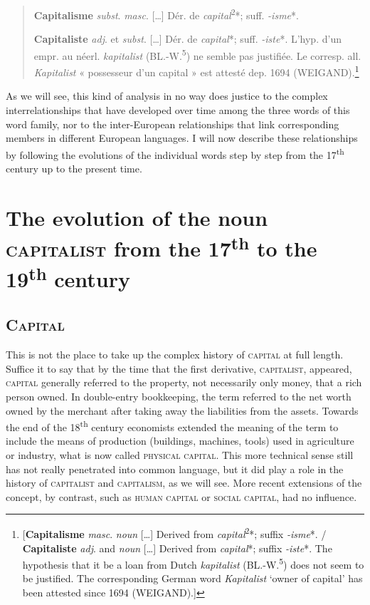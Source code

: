 \documentclass[output=paper]{langsci/langscibook}
\begin{document}
\begin{quote}
\textbf{Capitalisme} \emph{subst}. \emph{masc}. {[}\ldots{}{]} Dér. de
\emph{capital}\textsuperscript{2}*; suff. \emph{-isme}*.

\textbf{Capitaliste} \emph{adj}. et \emph{subst}. {[}\ldots{}{]} Dér. de
\emph{capital}*; suff. \emph{-iste}*. L'hyp. d'un empr. au néerl.
\emph{kapitalist} (BL.-W.\textsuperscript{5}) ne semble pas justifiée.
Le corresp. all. \emph{Kapitalist} « possesseur d'un capital » est
attesté dep. 1694 (WEIGAND).\footnote{{[}\textbf{Capitalisme}
  \emph{masc}. \emph{noun} {[}\ldots{}{]} Derived from
  \emph{capital}\textsuperscript{2}*; suffix \emph{-isme}*. /
  \textbf{Capitaliste} \emph{adj}. and \emph{noun} {[}\ldots{}{]}
  Derived from \emph{capital}*; suffix \emph{-iste}*. The hypothesis
  that it be a loan from Dutch \emph{kapitalist}
  (BL.-W.\textsuperscript{5}) does not seem to be justified. The
  corresponding German word \emph{Kapitalist} `owner of capital' has
  been attested since 1694 (WEIGAND).{]}}
\end{quote}

As we will see, this kind of analysis in no way does justice to the
complex interrelationships that have developed over time among the three
words of this word family, nor to the inter-European relationships that
link corresponding members in different European languages. I will now
 describe these relationships by following the evolutions of
the individual words step by step from the 17\textsuperscript{th} century up
to the present time.

\section{The evolution of the noun \textsc{capitalist} from the
17\textsuperscript{th} to the 19\textsuperscript{th} century}

\subsection{\textsc{Capital}}

This is not the place to take up the complex history of \textsc{capital}
at full length. Suffice it to say that by the time that the first
derivative, \textsc{capitalist}, appeared, \textsc{capital} generally
referred to the property, not necessarily only money, that a rich person
owned. In double-entry bookkeeping, the term referred to the net worth
owned by the merchant after taking away the liabilities from the assets.
Towards the end of the 18\textsuperscript{th} century economists
extended the meaning of the term to include the means of production
(buildings, machines, tools) used in agriculture or industry, what is
now called \textsc{physical capital}. This more technical sense still
has not really penetrated into common language, but it did play a role
in the history of \textsc{capitalist} and \textsc{capitalism}, as we
will see. More recent extensions of the concept, by contrast, such as
\textsc{human capital} or \textsc{social capital}, had no influence.
\end{document}
